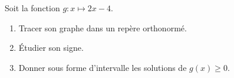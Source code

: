
\begin{exercice}\label{exosmath-0517}

    Soit la fonction \( g\colon x\mapsto 2x-4\).
    \begin{enumerate}
        \item
            Tracer son graphe dans un repère orthonormé.
        \item
            Étudier son signe.
        \item
            Donner sous forme d'intervalle les solutions de \( g(x)\geq 0\).
    \end{enumerate}

\end{exercice}
